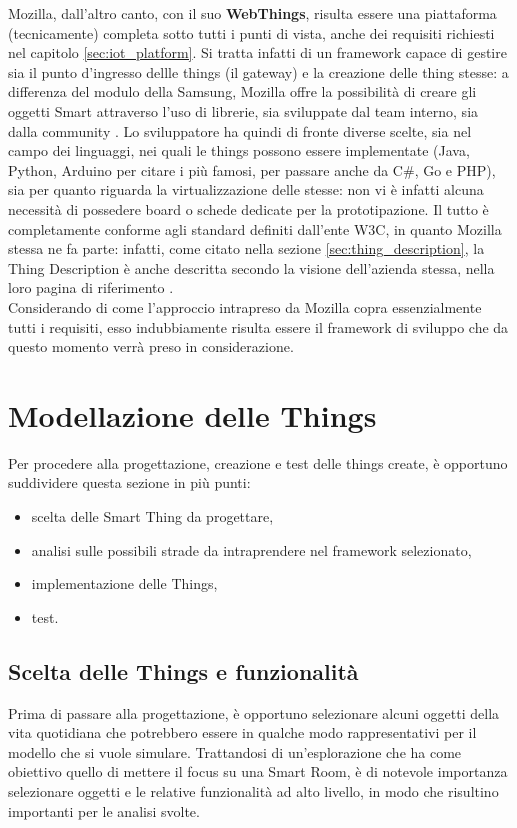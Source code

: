 \documentclass[12pt,a4paper,openright,oneside]{report}
\begin{document}
Mozilla, dall'altro canto, con il suo \textbf{WebThings}, risulta essere una piattaforma (tecnicamente) completa sotto tutti i punti di vista, anche dei requisiti richiesti nel capitolo \ref{sec:iot_platform}. Si tratta infatti di un framework capace di gestire sia il punto d'ingresso dellle things (il gateway) e la creazione delle thing stesse: a differenza del modulo della Samsung, Mozilla offre la possibilità di creare gli oggetti Smart attraverso l'uso di librerie, sia sviluppate dal team interno, sia dalla community \cite{mozilla-iot-framework}. Lo sviluppatore ha quindi di fronte diverse scelte, sia nel campo dei linguaggi, nei quali le things possono essere implementate (Java, Python, Arduino per citare i più famosi, per passare anche da C\#, Go e PHP), sia per quanto riguarda la virtualizzazione delle stesse: non vi è infatti alcuna necessità di possedere board o schede dedicate per la prototipazione. Il tutto è completamente conforme agli standard definiti dall'ente W3C, in quanto Mozilla stessa ne fa parte: infatti, come citato nella sezione \ref{sec:thing_description}, la Thing Description è anche descritta secondo la visione dell'azienda stessa, nella loro pagina di riferimento \cite{web_thing_api}.\\

Considerando di come l'approccio intrapreso da Mozilla copra essenzialmente tutti i requisiti, esso indubbiamente risulta essere il framework di sviluppo che da questo momento verrà preso in considerazione.


\section{Modellazione delle Things}

Per procedere alla progettazione, creazione e test delle things create, è opportuno suddividere questa sezione in più punti:

\begin{itemize}
	\setlength\itemsep{-0.7em}
	\item scelta delle Smart Thing da progettare,
	\item analisi sulle possibili strade da intraprendere nel framework selezionato,
	\item implementazione delle Things,
	\item test.
\end{itemize}


\subsection{Scelta delle Things e funzionalità}
Prima di passare alla progettazione, è opportuno selezionare alcuni oggetti della vita quotidiana che potrebbero essere in qualche modo rappresentativi per il modello che si vuole simulare. Trattandosi di un'esplorazione che ha come obiettivo quello di mettere il focus su una Smart Room, è di notevole importanza selezionare oggetti e le relative funzionalità ad alto livello, in modo che risultino importanti per le analisi svolte.\\
\end{document}
